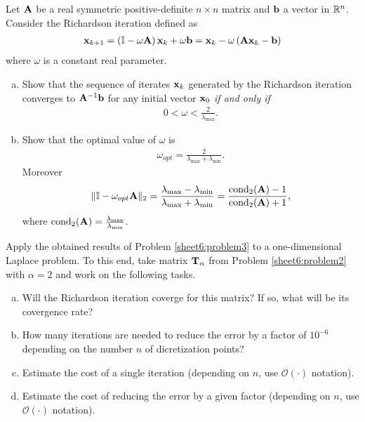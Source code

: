 \begin{Sheet}
  \begin{Problem}
    \label{sheet6:problem3}
    Let $\mathbf A$ be a real symmetric positive-definite $n\times n$
    matrix and $\mathbf b$ a vector in $\mathbb R^n$. Consider the Richardson
    iteration defined as
    \begin{gather*}
      \mathbf x_{k+1}
      = \left(\mathbb I-\omega\mathbf A \right)\mathbf x_k + \omega\mathbf b
      = \mathbf x_k - \omega\left(\mathbf A\mathbf x_k - \mathbf b \right)
    \end{gather*}
    where $\omega$ is a constant real parameter.
    \begin{enumerate}[(a)]
    \item Show that the sequence of iterates $\mathbf x_k$ generated by the
      Richardson iteration converges to $\mathbf A^{-1}\mathbf b$ for any
      initial vector $\mathbf x_0$ \textit{if and only if}
      \begin{gather*}
        0 < \omega < \frac{2}{\lambda_{\max}}.
      \end{gather*}
    \item Show that the optimal value of $\omega$ is
      \begin{gather*}
        \omega_{opt} = \frac2{\lambda_{\max} + \lambda_{\min}}.
      \end{gather*}
      Moreover
      \begin{gather*}
        \lVert\mathbb I-\omega_{opt}\mathbf A\rVert_2
        = \frac{\lambda_{\max} - \lambda_{\min}}{\lambda_{\max} + \lambda_{\min}}
        = \frac{\operatorname{cond}_2(\mathbf A)-1}{\operatorname{cond}_2(\mathbf A)+1},
      \end{gather*}
      where $\operatorname{cond}_2(\mathbf A) = \frac{\lambda_{\max}}{\lambda_{\min}}$.
    \end{enumerate}
  \end{Problem}

  \begin{Problem}
    Apply the obtained results of Problem \ref{sheet6:problem3} to a
    one-dimensional Laplace problem. To this end, take matrix
    $\mathbf T_{\alpha}$ from Problem \ref{sheet6:problem2} with
    $\alpha = 2$ and work on the following tasks.
    \begin{enumerate}[(a)]
    \item Will the Richardson iteration coverge for this matrix? If
      so, what will be its covergence rate?
    \item How many iterations are needed to reduce the error by a
      factor of $10^{-6}$ depending on the number $n$ of dicretization
      points?
    \item Estimate the cost of a single iteration (depending on $n$,
      use $\mathcal{O}(\cdot)$ notation).
    \item Estimate the cost of reducing the error by a given factor
      (depending on $n$, use $\mathcal{O}(\cdot)$ notation).
    \end{enumerate}
  \end{Problem}

\end{Sheet}



